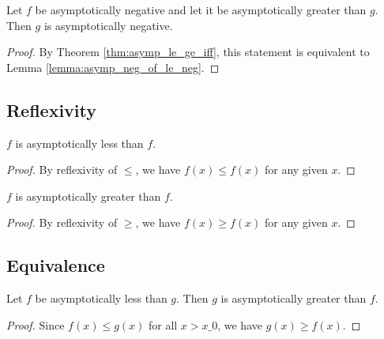 \begin{lemma}
    \label{lemma:asymp_neg_of_neg_ge}
    \leanok
    Let $f$ be asymptotically negative and let it be asymptotically greater than $g$.
    Then $g$ is asymptotically negative.
\end{lemma}

\begin{proof}
    \leanok
    By Theorem \ref{thm:asymp_le_ge_iff}, this statement is equivalent to Lemma
    \ref{lemma:asymp_neg_of_le_neg}.
\end{proof}


\subsection{Reflexivity}

\begin{lemma}
    \label{lemma:asymp_le_refl}
    \leanok
    $f$ is asymptotically less than $f$.
\end{lemma}

\begin{proof}
    \leanok
    By reflexivity of $\le$, we have $f(x) \le f(x)$ for any given $x$.
\end{proof}

\begin{lemma}
    \label{lemma:asymp_ge_refl}
    \leanok
    $f$ is asymptotically greater than $f$.
\end{lemma}

\begin{proof}
    \leanok
    By reflexivity of $\ge$, we have $f(x) \ge f(x)$ for any given $x$.
\end{proof}


\subsection{Equivalence}

\begin{lemma}
    \label{lemma:asymp_le_of_ge}
    \leanok
    Let $f$ be asymptotically less than $g$. Then $g$ is asymptotically
    greater than $f$.
\end{lemma}

\begin{proof}
    \leanok
    Since $f(x) \le g(x)$ for all $x > x\_0$, we have $g(x) \ge f(x)$.
\end{proof}

